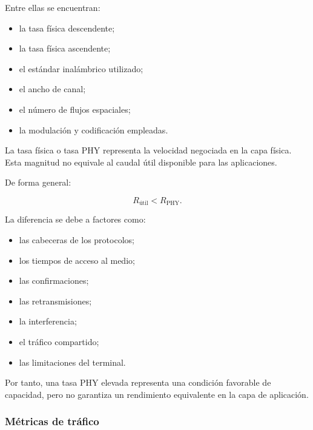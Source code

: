 Entre ellas se encuentran:

\begin{itemize}
    \item la tasa física descendente;

    \item la tasa física ascendente;

    \item el estándar inalámbrico utilizado;

    \item el ancho de canal;

    \item el número de flujos espaciales;

    \item la modulación y codificación empleadas.
\end{itemize}

La tasa física o tasa PHY representa la velocidad negociada en la capa
física. Esta magnitud no equivale al caudal útil disponible para las
aplicaciones.

De forma general:

\[
    R_{\mathrm{útil}}
    <
    R_{\mathrm{PHY}}.
\]

La diferencia se debe a factores como:

\begin{itemize}
    \item las cabeceras de los protocolos;

    \item los tiempos de acceso al medio;

    \item las confirmaciones;

    \item las retransmisiones;

    \item la interferencia;

    \item el tráfico compartido;

    \item las limitaciones del terminal.
\end{itemize}

Por tanto, una tasa PHY elevada representa una condición favorable de
capacidad, pero no garantiza un rendimiento equivalente en la capa de
aplicación.


\subsubsection*{Métricas de tráfico}

